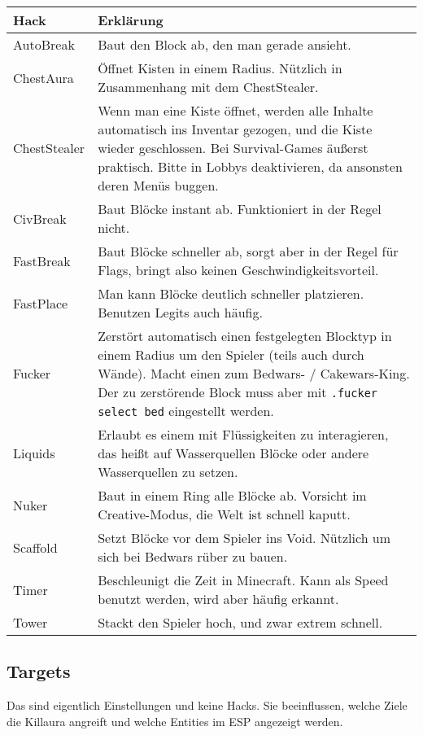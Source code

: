 \begin{longtable}{p{3cm}|p{10cm}}
\textbf{Hack} & \textbf{Erklärung} \\
\hline
AutoBreak & Baut den Block ab, den man gerade ansieht. \\
\hline
\rowcolor{lime!50}ChestAura & Öffnet Kisten in einem Radius. Nützlich in Zusammenhang mit dem ChestStealer. \\
\hline
\rowcolor{lime!50}ChestStealer & Wenn man eine Kiste öffnet, werden alle Inhalte automatisch ins Inventar gezogen, und die Kiste wieder geschlossen. Bei Survival-Games äußerst praktisch. Bitte in Lobbys deaktivieren, da ansonsten deren Menüs buggen. \\
\hline
CivBreak & Baut Blöcke instant ab. Funktioniert in der Regel nicht. \\
\hline
FastBreak & Baut Blöcke schneller ab, sorgt aber in der Regel für Flags, bringt also keinen Geschwindigkeitsvorteil. \\
\hline
FastPlace & Man kann Blöcke deutlich schneller platzieren. Benutzen Legits auch häufig. \\
\hline
\rowcolor{lime!50}Fucker & Zerstört automatisch einen festgelegten Blocktyp in einem Radius um den Spieler (teils auch durch Wände). Macht einen zum Bedwars- / Cakewars-King. Der zu zerstörende Block muss aber mit \texttt{.fucker select bed} eingestellt werden. \\
\hline
Liquids & Erlaubt es einem mit Flüssigkeiten zu interagieren, das heißt auf Wasserquellen Blöcke oder andere Wasserquellen zu setzen. \\
\hline
Nuker & Baut in einem Ring alle Blöcke ab. Vorsicht im Creative-Modus, die Welt ist schnell kaputt. \\
\hline
\rowcolor{lime!50}Scaffold & Setzt Blöcke vor dem Spieler ins Void. Nützlich um sich bei Bedwars rüber zu bauen. \\
\hline
Timer & Beschleunigt die Zeit in Minecraft. Kann als Speed benutzt werden, wird aber häufig erkannt. \\
\hline
\rowcolor{lime!50}Tower & Stackt den Spieler hoch, und zwar extrem schnell. \\
\end{longtable}

\subsection{Targets}

Das sind eigentlich Einstellungen und keine Hacks. Sie beeinflussen, welche Ziele die Killaura angreift und welche Entities im ESP angezeigt werden.

